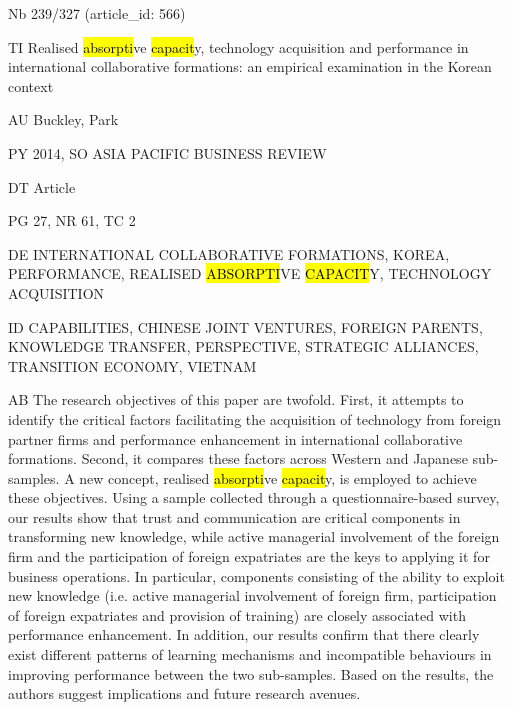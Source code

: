 \documentclass[a4paper]{article}
\begin{document}
\vspace*{-2cm}
Nb \tabto{0cm}239/327 (article\_id: 566)\par
TI \tabto{0cm}Realised \hl{absorpti}ve \hl{capacit}y, technology acquisition and performance in international collaborative formations: an empirical examination in the Korean context\par
AU \tabto{0cm}Buckley, Park\par
PY \tabto{0cm}2014, SO ASIA PACIFIC BUSINESS REVIEW\par
DT \tabto{0cm}Article\par
PG \tabto{0cm}27, NR 61, TC 2\par
DE \tabto{0cm}INTERNATIONAL COLLABORATIVE FORMATIONS, KOREA, PERFORMANCE, REALISED \hl{ABSORPTI}VE \hl{CAPACIT}Y, TECHNOLOGY ACQUISITION\par
ID \tabto{0cm}CAPABILITIES, CHINESE JOINT VENTURES, FOREIGN PARENTS, KNOWLEDGE TRANSFER, PERSPECTIVE, STRATEGIC ALLIANCES, TRANSITION ECONOMY, VIETNAM\par
AB \tabto{0cm}The research objectives of this paper are twofold. First, it attempts to identify the critical factors facilitating the acquisition of technology from foreign partner firms and performance enhancement in international collaborative formations. Second, it compares these factors across Western and Japanese sub-samples. A new concept, realised \hl{absorpti}ve \hl{capacit}y, is employed to achieve these objectives. Using a sample collected through a questionnaire-based survey, our results show that trust and communication are critical components in transforming new knowledge, while active managerial involvement of the foreign firm and the participation of foreign expatriates are the keys to applying it for business operations. In particular, components consisting of the ability to exploit new knowledge (i.e. active managerial involvement of foreign firm, participation of foreign expatriates and provision of training) are closely associated with performance enhancement. In addition, our results confirm that there clearly exist different patterns of learning mechanisms and incompatible behaviours in improving performance between the two sub-samples. Based on the results, the authors suggest implications and future research avenues.\par
\clearpage
\end{document}
